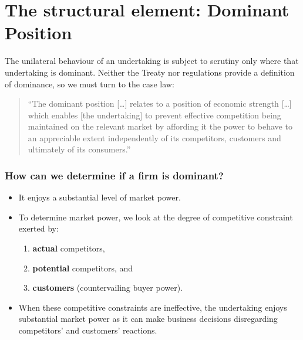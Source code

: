\section{The structural element: Dominant Position}

    The unilateral behaviour of an undertaking is subject to scrutiny only where that undertaking is dominant.
    Neither the Treaty nor regulations provide a definition of dominance, so we must turn to the case law:
        \begin{quote}
            “The dominant position […] relates to a position of economic strength […] which enables [the undertaking] to prevent effective competition being maintained on the relevant market by affording it the power to behave to an appreciable extent independently of its competitors, customers and ultimately of its consumers.”
        \end{quote}

        \subsubsection{How can we determine if a firm is dominant?}
    
            \begin{itemize}
                \item It enjoys a substantial level of market power.
                \item To determine market power, we look at the degree of competitive constraint exerted by:
                \begin{enumerate}
                    \item \textbf{actual} competitors,
                    \item \textbf{potential} competitors, and
                    \item \textbf{customers} (countervailing buyer power).
                \end{enumerate}
                \item When these competitive constraints are ineffective, the undertaking enjoys substantial market power as it can make business decisions disregarding competitors’ and customers’ reactions.
            \end{itemize}

